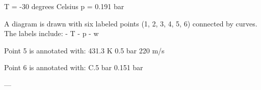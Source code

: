 T = -30 degrees Celsius  
p = 0.191 bar  

A diagram is drawn with six labeled points (1, 2, 3, 4, 5, 6) connected by curves. The labels include:  
- T  
- p  
- w  

Point 5 is annotated with:  
431.3 K  
0.5 bar  
220 m/s  

Point 6 is annotated with:  
C.5 bar  
0.151 bar  

---